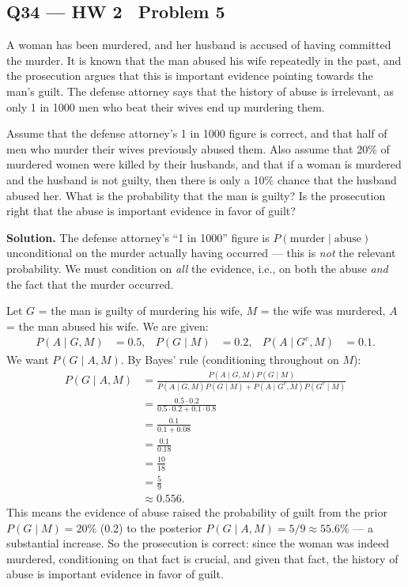 \documentclass[11pt]{article}
\begin{document}
\subsection*{Q34 --- HW 2 \textperiodcentered\ Problem 5}
\begin{qbox}
A woman has been murdered, and her husband is accused of having committed the murder. It is known that the man abused his wife repeatedly in the past, and the prosecution argues that this is important evidence pointing towards the man's guilt. The defense attorney says that the history of abuse is irrelevant, as only 1 in 1000 men who beat their wives end up murdering them.

Assume that the defense attorney's 1 in 1000 figure is correct, and that half of men who murder their wives previously abused them. Also assume that 20\% of murdered women were killed by their husbands, and that if a woman is murdered and the husband is not guilty, then there is only a 10\% chance that the husband abused her. What is the probability that the man is guilty? Is the prosecution right that the abuse is important evidence in favor of guilt?
\end{qbox}
\textbf{Solution.} The defense attorney's ``1 in 1000'' figure is $P(\text{murder}\mid\text{abuse})$ unconditional on the murder actually having occurred — this is \emph{not} the relevant probability. We must condition on \emph{all} the evidence, i.e., on both the abuse \emph{and} the fact that the murder occurred.

Let $G$ = the man is guilty of murdering his wife, $M$ = the wife was murdered, $A$ = the man abused his wife. We are given:
\begin{align*}
P(A\mid G,M) &= 0.5, & P(G\mid M) &= 0.2, & P(A\mid G^c,M) &= 0.1.
\end{align*}
We want $P(G\mid A,M)$. By Bayes' rule (conditioning throughout on $M$):
\begin{align*}
P(G\mid A,M) &= \frac{P(A\mid G,M)P(G\mid M)}{P(A\mid G,M)P(G\mid M) + P(A\mid G^c,M)P(G^c\mid M)} \\
&= \frac{0.5\cdot 0.2}{0.5\cdot 0.2 + 0.1\cdot 0.8} \\
&= \frac{0.1}{0.1+0.08} \\
&= \frac{0.1}{0.18} \\
&= \frac{10}{18} \\
&= \frac{5}{9} \\
&\approx 0.556.
\end{align*}
This means the evidence of abuse raised the probability of guilt from the prior $P(G\mid M)=20\%$ (0.2) to the posterior $P(G\mid A,M) = 5/9 \approx 55.6\%$ — a substantial increase. So the prosecution is correct: since the woman was indeed murdered, conditioning on that fact is crucial, and given that fact, the history of abuse is important evidence in favor of guilt.
\end{document}
